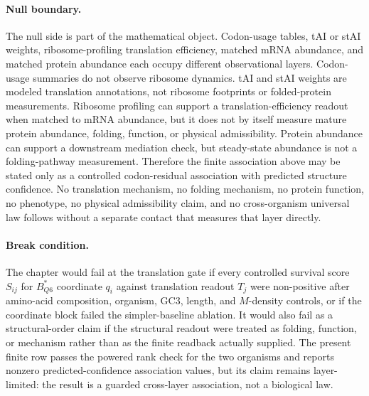 \paragraph{Null boundary.}
The null side is part of the mathematical object.  Codon-usage tables, tAI or stAI weights, ribosome-profiling translation efficiency, matched mRNA abundance, and matched protein abundance each occupy different observational layers.  Codon-usage summaries do not observe ribosome dynamics.  tAI and stAI weights are modeled translation annotations, not ribosome footprints or folded-protein measurements.  Ribosome profiling can support a translation-efficiency readout when matched to mRNA abundance, but it does not by itself measure mature protein abundance, folding, function, or physical admissibility.  Protein abundance can support a downstream mediation check, but steady-state abundance is not a folding-pathway measurement.  Therefore the finite association above may be stated only as a controlled codon-residual association with predicted structure confidence.  No translation mechanism, no folding mechanism, no protein function, no phenotype, no physical admissibility claim, and no cross-organism universal law follows without a separate contact that measures that layer directly.

\paragraph{Break condition.}
The chapter would fail at the translation gate if every controlled survival score $S_{ij}$ for $B^{*}_{Q6}$ coordinate $q_i$ against translation readout $T_j$ were non-positive after amino-acid composition, organism, GC3, length, and $M$-density controls, or if the coordinate block failed the simpler-baseline ablation.  It would also fail as a structural-order claim if the structural readout were treated as folding, function, or mechanism rather than as the finite readback actually supplied.  The present finite row passes the powered rank check for the two organisms and reports nonzero predicted-confidence association values, but its claim remains layer-limited: the result is a guarded cross-layer association, not a biological law.

